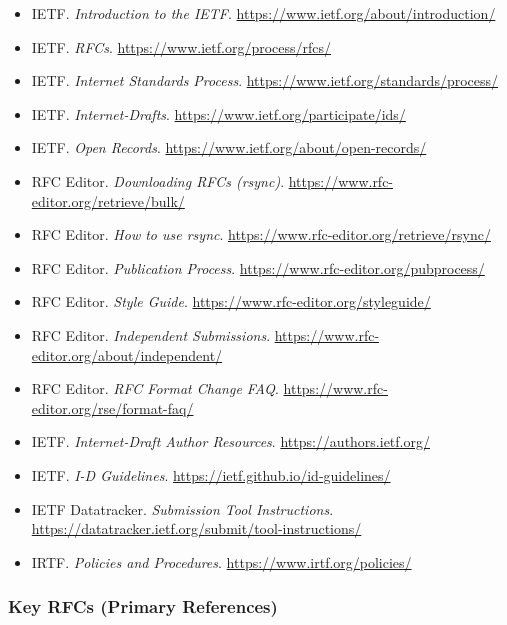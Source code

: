 \documentclass[11pt,letterpaper]{article}
\begin{document}
\begin{itemize}[noitemsep]
  \item IETF. \textit{Introduction to the IETF}. \url{https://www.ietf.org/about/introduction/}
  \item IETF. \textit{RFCs}. \url{https://www.ietf.org/process/rfcs/}
  \item IETF. \textit{Internet Standards Process}. \url{https://www.ietf.org/standards/process/}
  \item IETF. \textit{Internet-Drafts}. \url{https://www.ietf.org/participate/ids/}
  \item IETF. \textit{Open Records}. \url{https://www.ietf.org/about/open-records/}
  \item RFC Editor. \textit{Downloading RFCs (rsync)}. \url{https://www.rfc-editor.org/retrieve/bulk/}
  \item RFC Editor. \textit{How to use rsync}. \url{https://www.rfc-editor.org/retrieve/rsync/}
  \item RFC Editor. \textit{Publication Process}. \url{https://www.rfc-editor.org/pubprocess/}
  \item RFC Editor. \textit{Style Guide}. \url{https://www.rfc-editor.org/styleguide/}
  \item RFC Editor. \textit{Independent Submissions}. \url{https://www.rfc-editor.org/about/independent/}
  \item RFC Editor. \textit{RFC Format Change FAQ}. \url{https://www.rfc-editor.org/rse/format-faq/}
  \item IETF. \textit{Internet-Draft Author Resources}. \url{https://authors.ietf.org/}
  \item IETF. \textit{I-D Guidelines}. \url{https://ietf.github.io/id-guidelines/}
  \item IETF Datatracker. \textit{Submission Tool Instructions}. \url{https://datatracker.ietf.org/submit/tool-instructions/}
  \item IRTF. \textit{Policies and Procedures}. \url{https://www.irtf.org/policies/}
\end{itemize}

\subsubsection{Key RFCs (Primary References)}
\end{document}
